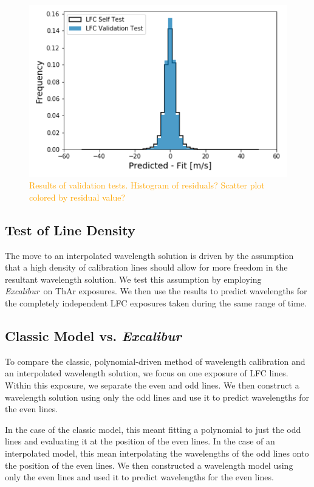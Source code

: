 \documentclass[twocolumn]{aastex63}
\newcommand{\lz}[1]{\textcolor{orange}{#1}}
\newcommand{\project}[1]{\textsl{#1}}
\newcommand{\name}{\project{Excalibur}}
\begin{document}
\begin{figure}[h]
\centering
\includegraphics[width=.5\textwidth]{Figures/lfcgood.png}
\caption{\lz{Results of validation tests.  Histogram of residuals?  Scatter plot colored by residual value?}}
\label{fig:testHists}
\end{figure} 


\subsection{Test of Line Density}\label{sec:test-density}
The move to an interpolated wavelength solution is driven by the assumption that a high density of calibration lines should allow for more freedom in the resultant wavelength solution.  We test this assumption by employing \name\ on ThAr exposures.  We then use the results to predict wavelengths for the completely independent LFC exposures taken during the same range of time.

\subsection{Classic Model vs. \name } \label{sec:test-classic}
To compare the classic, polynomial-driven method of wavelength calibration and an interpolated wavelength solution, we focus on one exposure of LFC lines.  Within this exposure, we separate the even and odd lines.  We then construct a wavelength solution using only the odd lines and use it to predict wavelengths for the even lines.

In the case of the classic model, this meant fitting a polynomial to just the odd lines and evaluating it at the position of the even lines.  In the case of an interpolated model, this mean interpolating the wavelengths of the odd lines onto the position of the even lines.  We then constructed a wavelength model using only the even lines and used it to predict wavelengths for the even lines.
\end{document}
